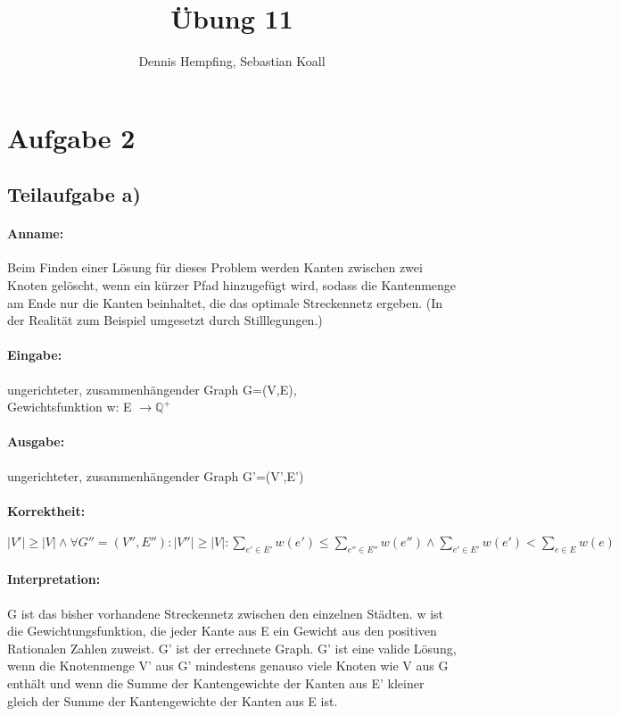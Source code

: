 \documentclass[12pt]{scrartcl}%
\theoremstyle{nonumberplain}
\newcommand{\Q}{\mathbb{Q}}
\begin{document}
\author{Dennis Hempfing, Sebastian Koall}
\title{Übung 11}
\date{} 
\pagestyle{myheadings}

\maketitle %

\section*{Aufgabe 2}

\subsection*{Teilaufgabe a)}

\paragraph{Anname:} Beim Finden einer Lösung für dieses Problem werden Kanten zwischen zwei Knoten gelöscht, wenn ein kürzer Pfad hinzugefügt wird, sodass die Kantenmenge am Ende nur die Kanten beinhaltet, die das optimale Streckennetz ergeben. (In der Realität zum Beispiel umgesetzt durch Stilllegungen.)
\paragraph{Eingabe:} ungerichteter, zusammenhängender Graph G=(V,E), \\Gewichtsfunktion w: E $\rightarrow \Q ^+$
\paragraph{Ausgabe:} ungerichteter, zusammenhängender Graph G'=(V',E')
\paragraph{Korrektheit:} $|V'| \ge |V| \wedge \forall G''=(V'', E''): |V''| \ge |V|: \sum_{e' \in E'}^{}w(e') \le \sum_{e'' \in E''}^{}w(e'') \wedge \sum_{e' \in E'}^{}w(e') < \sum_{e \in E}^{}w(e)$
\paragraph{Interpretation:} G ist das bisher vorhandene Streckennetz zwischen den einzelnen Städten. w ist die Gewichtungsfunktion, die jeder Kante aus E ein Gewicht aus den positiven Rationalen Zahlen zuweist. G' ist der errechnete Graph. G' ist eine valide Lösung, wenn die Knotenmenge V' aus G' mindestens genauso viele Knoten wie V aus G enthält und wenn die Summe der Kantengewichte der Kanten aus E' kleiner gleich der Summe der Kantengewichte der Kanten aus E ist.
\end{document}

